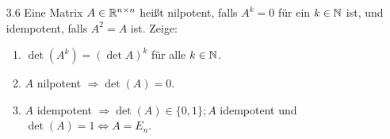 \documentclass{HM}
\begin{document}
\begin{enumerate}
		\item[3.6] Eine Matrix $A\in\mathbb{R}^{n\times n}$ heißt nilpotent, falls $A^k=0$ für ein $k\in\mathbb{N}$ ist, und idempotent, falls $A^2=A$ ist. Zeige:
		\begin{enumerate}
			\item $\det(A^k) = (\det A)^k$ für alle $k\in\mathbb{N}$.
			\item $A$ nilpotent $\Rightarrow \det(A)=0$.
			\item $A$ idempotent $\Rightarrow \det(A)\in\{0,1\} ; A$ idempotent und $\det(A)=1\Leftrightarrow A=E_n$.
		\end{enumerate}
	\end{enumerate}
\end{document}
